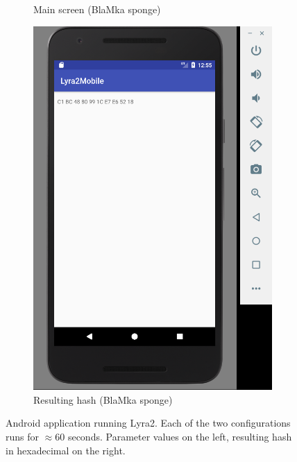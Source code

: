 \begin{figure}[H]
\begin{subfigure}{.5\textwidth}
  \caption{Main screen (BlaMka sponge)}
  \label{fig:lyra2-mobile-main}
\end{subfigure}%
\begin{subfigure}{.5\textwidth}
  \centering
  \includegraphics[width=.8\linewidth]{figures/lyra2-mobile-result-blamka-clean}
  \caption{Resulting hash (BlaMka sponge)}
  \label{fig:lyra2-mobile-result}
\end{subfigure}
\caption{Android application running Lyra2. Each of the two configurations runs for \(\approx 60\) seconds. Parameter values on the left, resulting hash in hexadecimal on the right.}
\label{fig:lyra2-mobile-demo}
\end{figure}
